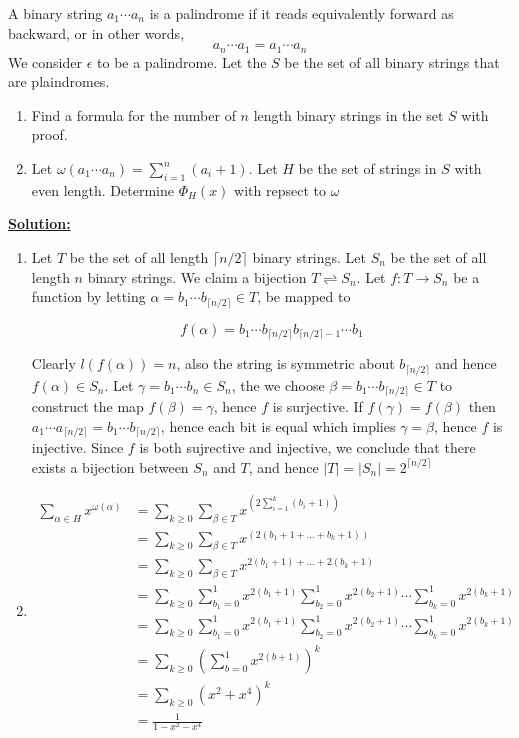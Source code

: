 \documentclass[11pt]{book}
\theoremstyle{definition}
\begin{document}
A binary string $a_1\cdots a_n$ is a palindrome if it reads equivalently forward as backward, or in other words,
$$a_n\cdots a_1 = a_1\cdots a_n$$
We consider $\epsilon$ to be a palindrome. Let the $S$ be the set of all binary strings that are plaindromes. 
\begin{enumerate}
\item Find a formula for the number of $n$ length binary strings in the set $S$ with proof.
\item Let $\omega(a_1\cdots a_n) = \sum_{i = 1}^n(a_i + 1)$. Let $H$ be the set of strings in $S$ with even length. Determine $\Phi_H(x)$ with repsect to $\omega$

\end{enumerate}

\textbf{\underline{Solution:}}
\begin{enumerate}
\item Let $T$ be the set of all length $\lceil n / 2 \rceil$ binary strings. Let $S_n$ be the set of all length $n$ binary strings. We claim a bijection $T \rightleftharpoons S_n$. Let $f \colon T \rightarrow S_n$ be a function by letting $\alpha = b_1\cdots b_{\lceil n / 2 \rceil} \in T$, be mapped to 

$$f(\alpha) = b_1\cdots b_{\lceil n / 2 \rceil}b_{\lceil n / 2 \rceil - 1}\cdots b_1$$

Clearly $l(f(\alpha)) = n$, also the string is symmetric about $b_{\lceil n / 2 \rceil}$ and hence $f(\alpha) \in S_n$. Let $\gamma = b_1\cdots b_n \in S_n$, the we choose $\beta = b_1\cdots b_{\lceil n / 2 \rceil} \in T$ to construct the map $f(\beta) = \gamma$, hence $f$ is surjective. If $f(\gamma) = f(\beta)$ then $a_1\cdots a_{\lceil n / 2 \rceil} = b_1\cdots b_{\lceil n / 2 \rceil}$, hence each bit is equal which implies $\gamma  = \beta$, hence $f$ is injective. Since $f$ is both sujrective and injective, we conclude that there exists a bijection between $S_n$ and $T$, and hence $|T| = |S_n| = 2^{\lceil n / 2 \rceil}$
\item \begin{align*}
\sum_{\alpha \in H}x^{\omega(\alpha)} &= \sum_{k \geq 0}\sum_{\beta\in T} x^{\left(2\sum_{i = 1}^k (b_i + 1)\right)}\\
&= \sum_{k \geq 0}\sum_{\beta \in T}x^{\left(2(b_1 + 1 + \dots + b_k + 1) \right)}\\
&= \sum_{k \geq 0}\sum_{\beta \in T}x^{2(b_1 + 1) + \dots + 2(b_k + 1)}\\
&= \sum_{k \geq 0}\sum_{b_1 = 0}^1x^{2(b_1 + 1)}\sum_{b_2 = 0}^1x^{2(b_2 + 1)} \cdots  \sum_{b_k = 0}^1x^{2(b_k + 1)}\\
&= \sum_{k \geq 0}\sum_{b_1 = 0}^1x^{2(b_1 + 1)}\sum_{b_2 = 0}^1x^{2(b_2 + 1)} \cdots  \sum_{b_k = 0}^1x^{2(b_k + 1)} \\
&= \sum_{k \geq 0}\left(\sum_{b = 0}^1x^{2(b + 1)} \right)^k\\
&= \sum_{k \geq 0}(x^2 + x^4)^k\\
&= \frac{1}{1 - x^2 - x^4}
\end{align*}

\end{enumerate}
\end{document}
